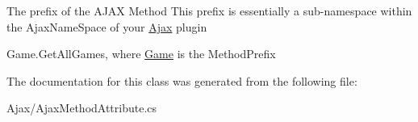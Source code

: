 The prefix of the A\+J\+A\+X Method This prefix is essentially a sub-\/namespace within the Ajax\+Name\+Space of your \hyperlink{namespace_snowflake_1_1_ajax}{Ajax} plugin 

Game.\+Get\+All\+Games, where \hyperlink{namespace_snowflake_1_1_game}{Game} is the Method\+Prefix



The documentation for this class was generated from the following file\+:\begin{DoxyCompactItemize}
\item 
Ajax/Ajax\+Method\+Attribute.\+cs\end{DoxyCompactItemize}
